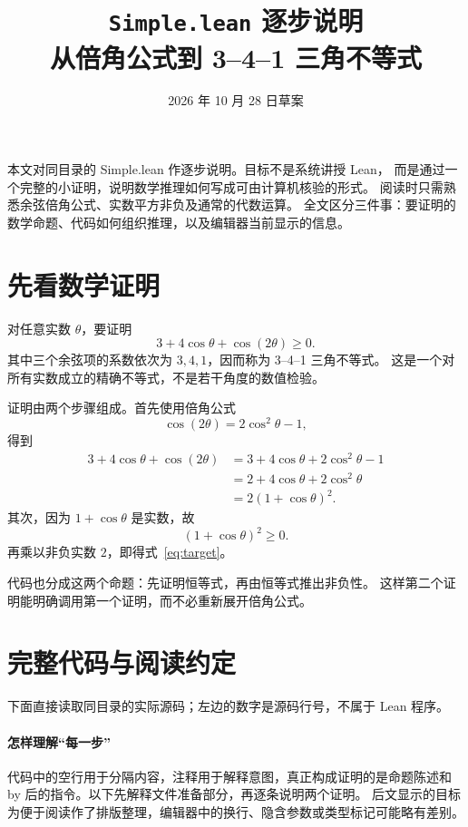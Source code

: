\documentclass[UTF8,fontset=fandol,a4paper,11pt]{ctexart}
\title{\texttt{Simple.lean} 逐步说明\\[0.3em]\large 从倍角公式到 3–4–1 三角不等式}
\author{}
\date{2026 年 10 月 28 日草案}
\newcommand{\code}[1]{{\small\ttfamily\def\_{\textunderscore\allowbreak}#1}}
\begin{document}
\maketitle

本文对同目录的 \code{Simple.lean} 作逐步说明。目标不是系统讲授 Lean，
而是通过一个完整的小证明，说明数学推理如何写成可由计算机核验的形式。
阅读时只需熟悉余弦倍角公式、实数平方非负及通常的代数运算。
全文区分三件事：要证明的数学命题、代码如何组织推理，以及编辑器当前显示的信息。

\section{先看数学证明}

对任意实数 $\theta$，要证明
\begin{equation}\label{eq:target}
  3+4\cos\theta+\cos(2\theta)\ge0.
\end{equation}
其中三个余弦项的系数依次为 $3,4,1$，因而称为 3–4–1 三角不等式。
这是一个对所有实数成立的精确不等式，不是若干角度的数值检验。

证明由两个步骤组成。首先使用倍角公式
\[
  \cos(2\theta)=2\cos^2\theta-1,
\]
得到
\begin{align*}
  3+4\cos\theta+\cos(2\theta)
  &=3+4\cos\theta+2\cos^2\theta-1\\
  &=2+4\cos\theta+2\cos^2\theta\\
  &=2(1+\cos\theta)^2.
\end{align*}
其次，因为 $1+\cos\theta$ 是实数，故
\[
  (1+\cos\theta)^2\ge0.
\]
再乘以非负实数 $2$，即得式~\eqref{eq:target}。

代码也分成这两个命题：先证明恒等式，再由恒等式推出非负性。
这样第二个证明能明确调用第一个证明，而不必重新展开倍角公式。

\clearpage
\section{完整代码与阅读约定}

下面直接读取同目录的实际源码；左边的数字是源码行号，不属于 Lean 程序。

\paragraph{怎样理解“每一步”}
代码中的空行用于分隔内容，注释用于解释意图，真正构成证明的是命题陈述和
\code{by} 后的指令。以下先解释文件准备部分，再逐条说明两个证明。
后文显示的目标为便于阅读作了排版整理，编辑器中的换行、隐含参数或类型标记可能略有差别。
\end{document}
